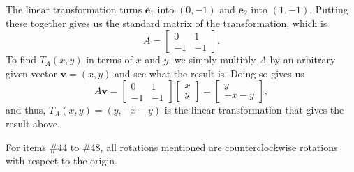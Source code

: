 \documentclass{article}
\begin{document}
\begin{enumerate}
        \begin{solution}
            The linear transformation turns \(\mathbf{e}_1\) into \((0,-1)\) and \(\mathbf{e}_2\) into \((1,-1)\). Putting these together gives us the standard matrix of the transformation, which is\[
                A = \begin{bmatrix}
                    0&1\\-1&-1
                \end{bmatrix}.    
            \] To find \(T_A(x,y)\) in terms of \(x\) and \(y\), we simply multiply \(A\) by an arbitrary given vector \(\mathbf{v}= (x,y)\) and see what the result is. Doing so gives us\[
                A\mathbf{v} = \begin{bmatrix}
                    0&1\\-1&-1
                \end{bmatrix} \begin{bmatrix}
                    x\\y
                \end{bmatrix} = \begin{bmatrix}
                    y\\-x-y
                \end{bmatrix},
            \] and thus, \(T_A(x,y) = (y,-x-y)\) is the linear transformation that gives the result above. 
        \end{solution}
\end{enumerate}
\begin{center}
    \colorbox{CornflowerBlue!50}{
    \begin{minipage}[c]{0.9\textwidth}
        \centering
        For items \#44 to \#48, all rotations mentioned are counterclockwise rotations with respect to the origin. 
    \end{minipage}
    }
\end{center}
\end{document}

